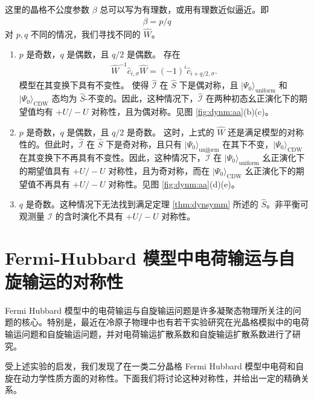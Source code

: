这里的晶格不公度参数 $\beta$ 总可以写为有理数，或用有理数近似逼近。即 
\begin{align}
\beta=p/q
\end{align}
对 $p,q$ 不同的情况，我们寻找不同的 $\hat{W}$。
\begin{enumerate}
\item $p$ 是奇数，$q$ 是偶数，且 $q/2$ 是偶数。
存在
\begin{align}
\hat{W}^{-1}\hat{c}_{i,\sigma}\hat{W}=(-1)^{i}\hat{c}_{i+q/2,\sigma}.  \label{W3} 
\end{align}
模型在其变换下具有不变性。
使得 $\hat{\mathcal{I}}$ 在 $\hat{S}$ 下是偶对称，且 $|\Psi_0\rangle_{\text{uniform}}$ 和 $|\Psi_0\rangle_{\text{CDW}}$ 态均为 $\hat{S}$-不变的。因此，这种情况下，$\hat{\mathcal{I}}$ 在两种初态幺正演化下的期望值均有 $+U/-U$ 对称性，且为偶对称。见图 \ref{fig:dynm:aa}(b)(c)。

\item $p$ 是奇数，$q$ 是偶数，且 $q/2$ 是奇数。
这时，上式的 $\hat{W}$ 还是满足模型的对称性的。但此时，$\hat{\mathcal{I}}$ 在 $\hat{S}$ 下是奇对称，且只有 $|\Psi_0\rangle_{\text{uniform}}$ 在其下不变，$|\Psi_0\rangle_{\text{CDW}}$ 在其变换下不再具有不变性。因此，这种情况下，$\hat{\mathcal{I}}$ 在 $|\Psi_0\rangle_{\text{uniform}}$ 幺正演化下的期望值具有 $+U/-U$ 对称性，且为奇对称，而在 $|\Psi_0\rangle_{\text{CDW}}$ 幺正演化下的期望值不再具有 $+U/-U$ 对称性。见图 \ref{fig:dynm:aa}(d)(e)。

\item $q$ 是奇数。这种情况下无法找到满足定理 \ref{thm:dynsymm} 所述的 $\hat{S}$。非平衡可观测量 $\mathcal{I}$ 的含时演化不具有 $+U/-U$ 对称性。
\end{enumerate}



\section{Fermi-Hubbard 模型中电荷输运与自旋输运的对称性}\label{sec:diffusion}

Fermi Hubbard 模型中的电荷输运与自旋输运问题是许多凝聚态物理所关注的问题的核心。特别是，最近在冷原子物理中也有若干实验研究在光晶格模拟中的电荷输运问题\cite{charge-diffusion}和自旋输运问题\cite{spin-diffusion}，并对电荷输运扩散系数和自旋输运扩散系数\cite{spin-diffusion}进行了研究。

受上述实验的启发，我们发现了在一类二分晶格 Fermi Hubbard 模型中电荷和自旋在动力学性质方面的对称性\cite{diffusion}。下面我们将讨论这种对称性，并给出一定的精确关系。

